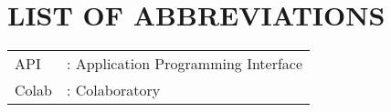 \newpage
\chapter*{LIST OF ABBREVIATIONS}
\begin{tabular}{l l}
API	&	:	Application Programming Interface	\\
Colab	&	:	Colaboratory	\\


\end{tabular}








